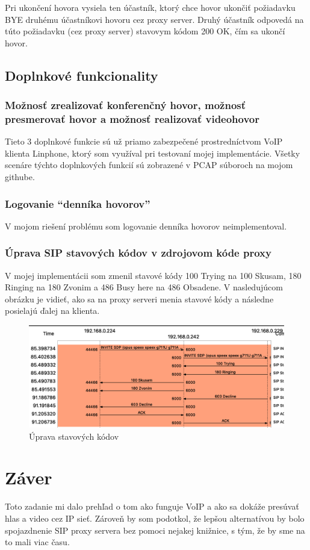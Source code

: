 Pri ukončení hovora vysiela ten účastník, ktorý chce hovor ukončiť požiadavku BYE druhému účastníkovi hovoru cez proxy server. Druhý účastník odpovedá na túto požiadavku (cez proxy server) stavovym kódom 200 OK, čím sa ukončí hovor.

\subsection{Doplnkové funkcionality}

\subsubsection{Možnosť zrealizovať konferenčný hovor, možnosť presmerovať hovor a možnosť realizovať videohovor}

Tieto 3 doplnkové funkcie sú už priamo zabezpečené prostredníctvom VoIP klienta Linphone, ktorý som využíval pri testovaní mojej implementácie. Všetky scenáre týchto doplnkových funkcií sú zobrazené v PCAP súboroch na mojom githube.

\subsubsection{Logovanie “denníka hovorov”}
V mojom riešení problému som logovanie denníka hovorov neimplementoval.

\subsubsection{Úprava SIP stavových kódov v zdrojovom kóde proxy}
V mojej implementácii som zmenil stavové kódy 100 Trying na 100 Skusam, 180 Ringing na 180 Zvonim a 486 Busy here na 486 Obsadene. V nasledujúcom obrázku je vidieť, ako sa na proxy serveri menia stavové kódy a následne posielajú ďalej na klienta.
\begin{figure}[H]
	\centering
	\includegraphics[width=1\textwidth]{stavove_kody.png}
	\caption{Úprava stavových kódov}
\end{figure}

\section{Záver}
Toto zadanie mi dalo prehľad o tom ako funguje VoIP a ako sa dokáže presúvať hlas a video cez IP sieť. Zároveň by som podotkol, že lepšou alternatívou by bolo spojazdnenie SIP proxy servera bez pomoci nejakej knižnice, s tým, že by sme na to mali viac času.



